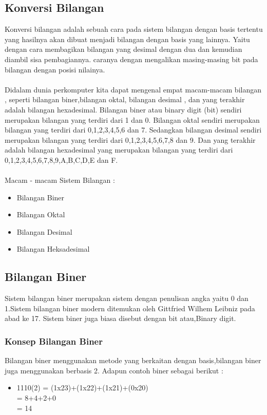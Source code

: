 ﻿%

\subsection{Konversi Bilangan}
Konversi bilangan adalah sebuah cara pada sistem bilangan dengan basis tertentu yang hasilnya akan dibuat menjadi bilangan dengan basis yang lainnya. 
Yaitu dengan cara membagikan bilangan yang desimal dengan dua dan kemudian diambil sisa pembagiannya.
caranya dengan mengalikan masing-masing bit pada bilangan dengan posisi nilainya.
\\\\Didalam dunia perkomputer kita dapat mengenal empat macam-macam bilangan , seperti bilangan biner,bilangan oktal, bilangan desimal , dan yang terakhir adalah bilangan hexadesimal. Bilangan biner atau binary digit (bit) sendiri merupakan bilangan yang terdiri dari 1 dan 0. Bilangan oktal sendiri merupakan bilangan yang terdiri dari 0,1,2,3,4,5,6 dan 7.
Sedangkan bilangan desimal sendiri merupakan bilangan yang terdiri dari 0,1,2,3,4,5,6,7,8 dan 9. Dan yang terakhir adalah bilangan hexadesimal yang merupakan bilangan yang terdiri dari 0,1,2,3,4,5,6,7,8,9,A,B,C,D,E dan F.
\\\\Macam - macam Sistem Bilangan :
\begin{itemize}
\item Bilangan Biner
\item Bilangan Oktal
\item Bilangan Desimal
\item Bilangan Heksadesimal
\end{itemize}

\subsection{Bilangan Biner}
Sistem bilangan biner merupakan sistem dengan penulisan angka yaitu 0 dan 1.Sistem bilangan biner modern ditemukan oleh Gittfried Wilhem Leibniz pada abad ke 17. Sistem biner juga biasa disebut dengan bit atau,Binary digit.
\subsubsection{Konsep Bilangan Biner}
Bilangan biner menggunakan metode yang berkaitan dengan basis,bilangan biner juga menggunakan berbasis 2. Adapun contoh biner sebagai berikut : \\
\begin{itemize}
\item 1110(2) = (1x23)+(1x22)+(1x21)+(0x20)\\
= 8+4+2+0\\
= 14 
\end{itemize}

